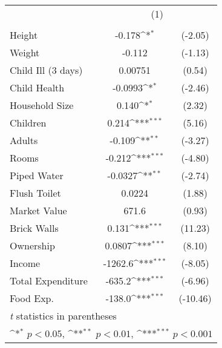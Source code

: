 {
\def\sym#1{\ifmmode^{#1}\else\(^{#1}\)\fi}
\begin{tabular}{l*{1}{cc}}
\hline\hline
                    &\multicolumn{2}{c}{(1)}           \\
                    &\multicolumn{2}{c}{}              \\
\hline
Height              &      -0.178\sym{*}  &     (-2.05)\\
Weight              &      -0.112         &     (-1.13)\\
Child Ill (3 days)  &     0.00751         &      (0.54)\\
Child Health        &     -0.0993\sym{*}  &     (-2.46)\\
Household Size      &       0.140\sym{*}  &      (2.32)\\
Children            &       0.214\sym{***}&      (5.16)\\
Adults              &      -0.109\sym{**} &     (-3.27)\\
Rooms               &      -0.212\sym{***}&     (-4.80)\\
Piped Water         &     -0.0327\sym{**} &     (-2.74)\\
Flush Toilet        &      0.0224         &      (1.88)\\
Market Value        &       671.6         &      (0.93)\\
Brick Walls         &       0.131\sym{***}&     (11.23)\\
Ownership           &      0.0807\sym{***}&      (8.10)\\
Income              &     -1262.6\sym{***}&     (-8.05)\\
Total Expenditure   &      -635.2\sym{***}&     (-6.96)\\
Food Exp.           &      -138.0\sym{***}&    (-10.46)\\
\hline\hline
\multicolumn{3}{l}{\footnotesize \textit{t} statistics in parentheses}\\
\multicolumn{3}{l}{\footnotesize \sym{*} \(p<0.05\), \sym{**} \(p<0.01\), \sym{***} \(p<0.001\)}\\
\end{tabular}
}
